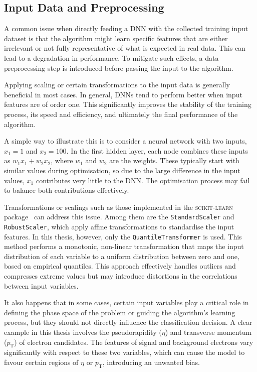 \subsection{Input Data and Preprocessing}
\label{dnn:preprocessing}

A common issue when directly feeding a DNN with the collected training input dataset is that the algorithm might learn specific features that are either irrelevant or not fully representative of what is expected in real data. This can lead to a degradation in performance. To mitigate such effects, a data preprocessing step is introduced before passing the input to the algorithm.

Applying scaling or certain transformations to the input data is generally beneficial in most cases. In general, DNNs tend to perform better when input features are of order one. This significantly improves the stability of the training process, its speed and efficiency, and ultimately the final performance of the algorithm.

A simple way to illustrate this is to consider a neural network with two inputs, $x_{1}=1$ and $x_{2}=100$. In the first hidden layer, each node combines these inputs as $w_{1}x_{1} + w_{2}x_{2}$, where $w_{1}$ and $w_{2}$ are the weights. These typically start with similar values during optimisation, so due to the large difference in the input values, $x_{1}$ contributes very little to the DNN. The optimisation process may fail to balance both contributions effectively.

Transformations or scalings such as those implemented in the \textsc{scikit-learn} package~\cite{scikitlearn} can address this issue. Among them are the \texttt{StandardScaler} and \texttt{RobustScaler}, which apply affine transformations to standardise the input features. In this thesis, however, only the \texttt{QuantileTransformer} is used. This method performs a monotonic, non-linear transformation that maps the input distribution of each variable to a uniform distribution between zero and one, based on empirical quantiles. This approach effectively handles outliers and compresses extreme values but may introduce distortions in the correlations between input variables.

It also happens that in some cases, certain input variables play a critical role in defining the phase space of the problem or guiding the algorithm’s learning process, but they should not directly influence the classification decision. A clear example in this thesis involves the pseudorapidity ($\eta$) and transverse momentum ($p_{\text{T}}$) of electron candidates. The features of signal and background electrons vary significantly with respect to these two variables, which can cause the model to favour certain regions of $\eta$ or $p_{\text{T}}$, introducing an unwanted bias.

